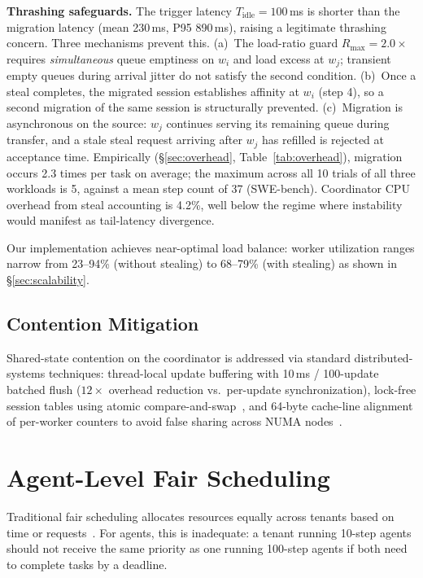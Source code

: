 \documentclass[sigconf]{acmart}
\begin{document}
\textbf{Thrashing safeguards.} The trigger latency $T_\text{idle}=100$\,ms is shorter than the migration latency (mean 230\,ms, P95 890\,ms), raising a legitimate thrashing concern. Three mechanisms prevent this. (a)~The load-ratio guard $R_\text{max}=2.0\times$ requires \emph{simultaneous} queue emptiness on $w_i$ and load excess at $w_j$; transient empty queues during arrival jitter do not satisfy the second condition. (b)~Once a steal completes, the migrated session establishes affinity at $w_i$ (step 4), so a second migration of the same session is structurally prevented. (c)~Migration is asynchronous on the source: $w_j$ continues serving its remaining queue during transfer, and a stale steal request arriving after $w_j$ has refilled is rejected at acceptance time. Empirically (\S\ref{sec:overhead}, Table~\ref{tab:overhead}), migration occurs 2.3 times per task on average; the maximum across all 10 trials of all three workloads is 5, against a mean step count of 37 (SWE-bench). Coordinator CPU overhead from steal accounting is 4.2\%, well below the regime where instability would manifest as tail-latency divergence.

Our implementation achieves near-optimal load balance: worker utilization ranges narrow from 23--94\% (without stealing) to 68--79\% (with stealing) as shown in \S\ref{sec:scalability}.

\subsection{Contention Mitigation}
\label{sec:contention}

Shared-state contention on the coordinator is addressed via standard distributed-systems techniques: thread-local update buffering with 10\,ms / 100-update batched flush ($12\times$ overhead reduction vs.\ per-update synchronization), lock-free session tables using atomic compare-and-swap~\cite{herlihy2012art}, and 64-byte cache-line alignment of per-worker counters to avoid false sharing across NUMA nodes~\cite{drepper2007every}.

\section{Agent-Level Fair Scheduling}
\label{sec:fairness}

Traditional fair scheduling allocates resources equally across tenants based on time or requests~\cite{mahajan2020themis,sheng2024vtc,ghodsi2011drf}. For agents, this is inadequate: a tenant running 10-step agents should not receive the same priority as one running 100-step agents if both need to complete tasks by a deadline.
\end{document}
